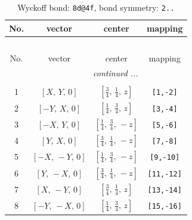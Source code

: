 \documentclass[fleqn,8pt]{jsarticle}
\begin{document}
\begin{longtable}{cccc}
\caption{Wyckoff bond: {\tt 8d@4f}, bond symmetry: {\tt 2..}}
 \\
 \hline \hline
No. & vector & center & mapping \\ \hline \endfirsthead

\multicolumn{3}{l}{\tablename\ \thetable{}} \\
 \hline \hline
No. & vector & center & mapping \\ \hline \endhead

 \hline \hline
\multicolumn{3}{r}{\footnotesize\it continued ...} \\ \endfoot

 \hline \hline
\multicolumn{3}{r}{} \\ \endlastfoot

1 & $\left[ X,\, Y,\, 0 \right]$ & $\left[ \frac{3}{4},\, \frac{1}{4},\, z \right]$ & {\tt [1,-2]} \\ \hline
2 & $\left[ - Y,\, X,\, 0 \right]$ & $\left[ \frac{1}{4},\, \frac{3}{4},\, z \right]$ & {\tt [3,-4]} \\ \hline
3 & $\left[ - X,\, Y,\, 0 \right]$ & $\left[ \frac{1}{4},\, \frac{3}{4},\, - z \right]$ & {\tt [5,-6]} \\ \hline
4 & $\left[ Y,\, X,\, 0 \right]$ & $\left[ \frac{3}{4},\, \frac{1}{4},\, - z \right]$ & {\tt [7,-8]} \\ \hline
5 & $\left[ - X,\, - Y,\, 0 \right]$ & $\left[ \frac{1}{4},\, \frac{3}{4},\, - z \right]$ & {\tt [9,-10]} \\ \hline
6 & $\left[ Y,\, - X,\, 0 \right]$ & $\left[ \frac{3}{4},\, \frac{1}{4},\, - z \right]$ & {\tt [11,-12]} \\ \hline
7 & $\left[ X,\, - Y,\, 0 \right]$ & $\left[ \frac{3}{4},\, \frac{1}{4},\, z \right]$ & {\tt [13,-14]} \\ \hline
8 & $\left[ - Y,\, - X,\, 0 \right]$ & $\left[ \frac{1}{4},\, \frac{3}{4},\, z \right]$ & {\tt [15,-16]} \\
\end{longtable}
\renewcommand{\arraystretch}{1.2}
\end{document}

